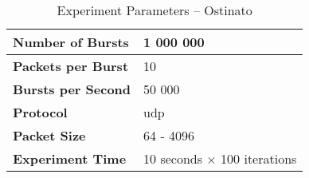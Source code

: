 \begin{table}[ht!]
    \small
    \caption{Experiment Parameters -- Ostinato}
    \label{ostinatoparam}
    \begin{adjustbox}{center}
        \renewcommand*\arraystretch{1.2}\begin{tabular}{| L{3.5cm} || L{4.5cm} |}
            \hline
            \textbf{Number of Bursts} & 1 000 000
            \\ \hline
            \textbf{Packets per Burst} & 10
            \\ \hline
            \textbf{Bursts per Second} & 50 000
            \\ \hline
            \textbf{Protocol} & \gls{udp}
            \\ \hline
            \textbf{Packet Size} & 64 - 4096
            \\ \hline
            \textbf{Experiment Time} & 10 seconds $\times$ 100 iterations
            \\ \hline
        \end{tabular}
    \end{adjustbox}
\end{table}
